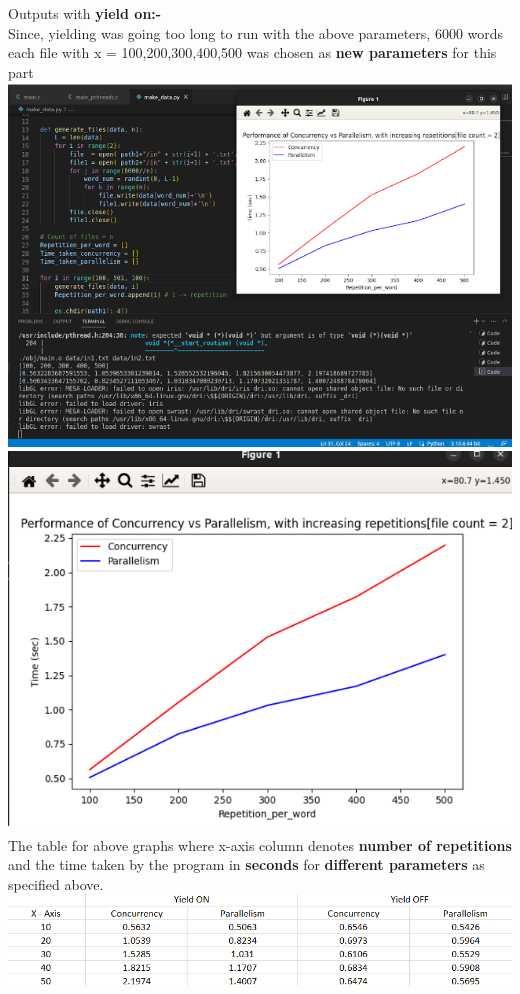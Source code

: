 \documentclass[12pt]{article}
\begin{document}
\begin{spacing}{1.2}
Outputs with \textbf{yield on:-}\\

Since, yielding was going too long to run with the above parameters, 6000 words each file with x = 100,200,300,400,500 was chosen as \textbf{new parameters} for this part\\
\includegraphics[width=18cm]{images/41.png}\\
\includegraphics[width=17cm]{images/42.png}\\

The table for above graphs where x-axis column denotes \textbf{number of repetitions} and the time taken by the program in \textbf{seconds} for \textbf{different parameters} as specified above.\\
\includegraphics[width=16cm]{images/image2.png}\\


\end{spacing}
\end{document}
